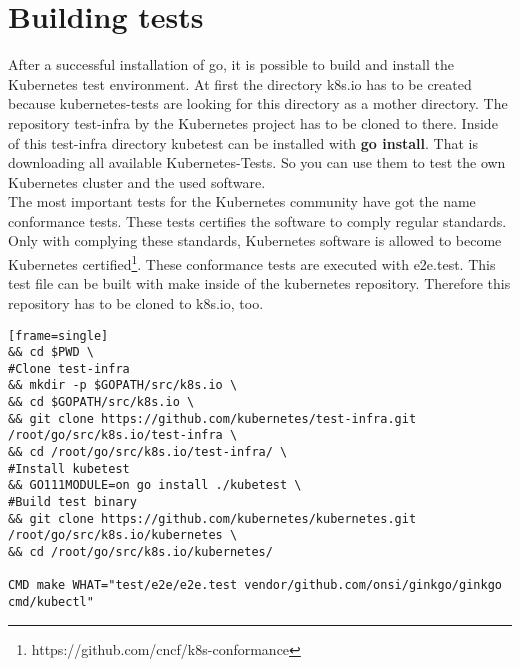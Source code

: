 \section{Building tests}
After a successful installation of go, it is possible to build and install the Kubernetes test environment.
At first the directory k8s.io has to be created because kubernetes-tests are looking for this directory as a mother directory. The repository test-infra by the Kubernetes project has to be cloned to there. Inside of this test-infra directory kubetest can be installed with \textbf{go install}. That is downloading all available Kubernetes-Tests. So you can use them to test the own Kubernetes cluster and the used software. \\

The most important tests for the Kubernetes community have got the name conformance tests. These tests certifies the software to comply regular standards. Only with complying these standards, Kubernetes software is allowed to become Kubernetes certified\footnote{https://github.com/cncf/k8s-conformance}. 
These conformance tests are executed with e2e.test. This test file can be built with make inside of the kubernetes repository. Therefore this repository has to be cloned to k8s.io, too.


\begin{verbatim}[frame=single]
&& cd $PWD \
#Clone test-infra
&& mkdir -p $GOPATH/src/k8s.io \
&& cd $GOPATH/src/k8s.io \
&& git clone https://github.com/kubernetes/test-infra.git 
/root/go/src/k8s.io/test-infra \
&& cd /root/go/src/k8s.io/test-infra/ \
#Install kubetest
&& GO111MODULE=on go install ./kubetest \
#Build test binary
&& git clone https://github.com/kubernetes/kubernetes.git 
/root/go/src/k8s.io/kubernetes \
&& cd /root/go/src/k8s.io/kubernetes/
 
CMD make WHAT="test/e2e/e2e.test vendor/github.com/onsi/ginkgo/ginkgo cmd/kubectl"
\end{verbatim}

\Blindtext
